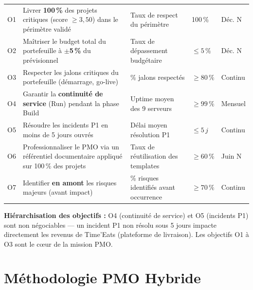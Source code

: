 \documentclass[11pt,a4paper,oneside]{report}
\begin{document}
\vspace{4pt}
\begin{center}
\renewcommand{\arraystretch}{1.6}
\begin{tabularx}{\textwidth}{C{0.4cm} L{5.5cm} C{2.5cm} C{2.5cm} L{2.5cm}}
\toprule
{}
\th{\#} &  &  &  &  \\
\midrule
O1 & Livrer \textbf{100\,\%} des projets critiques (score $\geq 3{,}50$) dans le périmètre validé & Taux de respect du périmètre & 100\,\% & Déc. N \\
O2 & Maîtriser le budget total du portefeuille à \textbf{$\pm$5\,\%} du prévisionnel & Taux de dépassement budgétaire & $\leq 5\,\%$ & Déc. N \\
O3 & Respecter les jalons critiques du portefeuille (démarrage, go-live) & \% jalons respectés & $\geq 80\,\%$ & Continu \\
O4 & Garantir la \textbf{continuité de service} (Run) pendant la phase Build & Uptime moyen des 9 serveurs & $\geq 99\,\%$ & Mensuel \\
O5 & Résoudre les incidents P1 en moins de 5 jours ouvrés & Délai moyen résolution P1 & $\leq 5\,j$ & Continu \\
O6 & Professionnaliser le PMO via un référentiel documentaire appliqué sur 100\,\% des projets & Taux de réutilisation des templates & $\geq 60\,\%$ & Juin N \\
O7 & Identifier \textbf{en amont} les risques majeurs (avant impact) & \% risques identifiés avant occurrence & $\geq 70\,\%$ & Continu \\
\bottomrule
\end{tabularx}
\end{center}

\begin{alert}
\textbf{Hiérarchisation des objectifs :} O4 (continuité de service) et O5 (incidents P1) sont non négociables — un incident P1 non résolu sous 5 jours impacte directement les revenus de Time'Eats (plateforme de livraison). Les objectifs O1 à O3 sont le cœur de la mission PMO.
\end{alert}

\newpage
\section{Méthodologie PMO Hybride}
\end{document}
